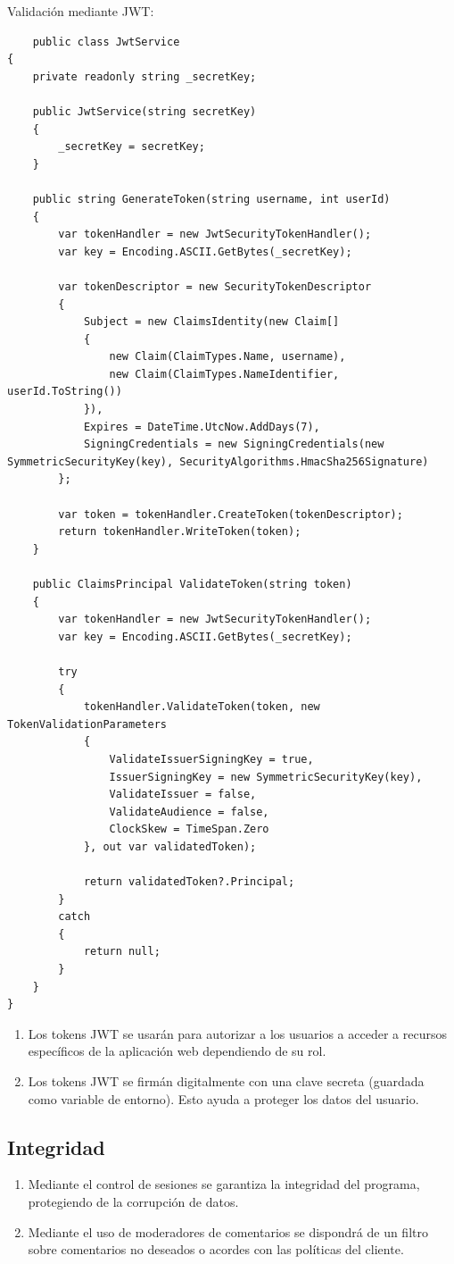 \documentclass{article} %
\begin{document}
Validación mediante JWT:
\begin{lstlisting}
    public class JwtService
{
    private readonly string _secretKey;

    public JwtService(string secretKey)
    {
        _secretKey = secretKey;
    }

    public string GenerateToken(string username, int userId)
    {
        var tokenHandler = new JwtSecurityTokenHandler();
        var key = Encoding.ASCII.GetBytes(_secretKey);

        var tokenDescriptor = new SecurityTokenDescriptor
        {
            Subject = new ClaimsIdentity(new Claim[]
            {
                new Claim(ClaimTypes.Name, username),
                new Claim(ClaimTypes.NameIdentifier, userId.ToString())
            }),
            Expires = DateTime.UtcNow.AddDays(7),
            SigningCredentials = new SigningCredentials(new SymmetricSecurityKey(key), SecurityAlgorithms.HmacSha256Signature)
        };

        var token = tokenHandler.CreateToken(tokenDescriptor);
        return tokenHandler.WriteToken(token);
    }

    public ClaimsPrincipal ValidateToken(string token)
    {
        var tokenHandler = new JwtSecurityTokenHandler();
        var key = Encoding.ASCII.GetBytes(_secretKey);

        try
        {
            tokenHandler.ValidateToken(token, new TokenValidationParameters
            {
                ValidateIssuerSigningKey = true,
                IssuerSigningKey = new SymmetricSecurityKey(key),
                ValidateIssuer = false,
                ValidateAudience = false,
                ClockSkew = TimeSpan.Zero
            }, out var validatedToken);

            return validatedToken?.Principal;
        }
        catch
        {
            return null;
        }
    }
}
\end{lstlisting}
\begin{enumerate}
    \item Los tokens JWT se usarán para autorizar a los usuarios a acceder a recursos específicos
de la aplicación web dependiendo de su rol.
\item Los tokens JWT se firmán digitalmente con una clave secreta (guardada como variable de entorno). Esto ayuda a proteger los
datos del usuario.

\end{enumerate}
\subsection{Integridad}
\begin{enumerate}
    \item Mediante el control de sesiones se garantiza la integridad del programa, protegiendo de la corrupción de datos.
    \item Mediante el uso de moderadores de comentarios se dispondrá de un filtro sobre comentarios no deseados o acordes con las políticas del cliente.
\end{enumerate}
\end{document}
